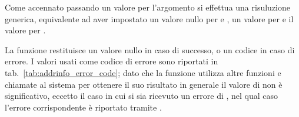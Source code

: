 Come accennato passando un valore  per l'argomento  si
effettua una risuluzione generica, equivalente ad aver impostato un valore
nullo per  e , un valore 
per  e il valore  per
. 

La funzione restituisce un valore nullo in caso di successo, o un codice in
caso di errore. I valori usati come codice di errore sono riportati in
tab.~\ref{tab:addrinfo_error_code}; dato che la funzione utilizza altre
funzioni e chiamate al sistema per ottenere il suo risultato in generale il
valore di  non è significativo, eccetto il caso in cui si sia
ricevuto un errore di , nel qual caso l'errore
corrispondente è riportato tramite .

